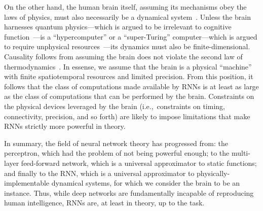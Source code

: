On the other hand, the human brain itself, assuming its mechanisms obey the laws of physics, must also necessarily be a dynamical system~\citep{mckenna1994brain, port1995mind}.
Unless the brain harnesses quantum physics---which is argued to be irrelevant to cognitive function~\citep{litt2006brain}---is a ``hypercomputer'' or a ``super-Turing'' computer---which is argued to require unphysical resources~\citep{broersma2018computability}---its dynamics must also be finite-dimensional.
Causality follows from assuming the brain does not violate the second law of thermodynamics~\citep{evans1996causality}.
In essense, we assume that the brain is a physical ``machine'' with finite spatiotemporal resources and limited precision.
From this position, it follows that the class of computations made available by RNNs is at least as large as the class of computations that can be performed by the brain.
Constraints on the physical devices leveraged by the brain (i.e.,~constraints on timing, connectivity, precision, and so forth) are likely to impose limitations that make RNNs strictly more powerful in theory.

In summary, the field of neural network theory has progressed from: the perceptron, which had the problem of not being powerful enough; to the multi-layer feed-forward network, which is a universal approximator to static functions; and finally to the RNN, which is a universal approximator to physically-implementable dynamical systems, for which we consider the brain to be an instance.
Thus, while deep networks are fundamentally incapable of reproducing human intelligence, RNNs are, at least in theory, up to the task.

